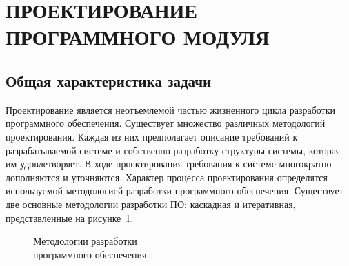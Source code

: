 \section[Проектирование программного модуля]{%
  ПРОЕКТИРОВАНИЕ ПРОГРАММНОГО МОДУЛЯ
}\label{sec:design}

\subsection{Общая характеристика задачи}

Проектирование является неотъемлемой частью жизненного цикла
разработки программного обеспечения.
Существует множество различных методологий проектирования.
Каждая из них предполагает описание требований к разрабатываемой системе
и собственно разработку структуры системы, которая им удовлетворяет.
В ходе проектирования требования к системе многократно дополняются и уточняются.
Характер процесса проектирования определятся используемой
методологией разработки программного обеспечения.
Существует две основные методологии разработки ПО:
каскадная и итеративная, представленные на рисунке~\ref{fig:design_methods}.

\begin{figure}[h!]
  \centering
  \caption{Методологии разработки \\ программного обеспечения}
  \label{fig:design_methods}
\end{figure}

